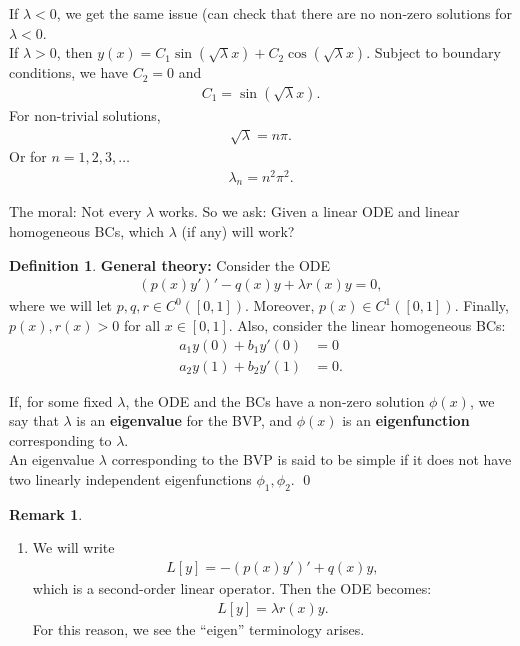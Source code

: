 \documentclass{article}
\theoremstyle{definition}
\newtheorem{defn}{Definition}[section]
\newtheorem{rmk}{Remark}[section]
\begin{document}
If $\lambda < 0$, we get the same issue (can check that there are no non-zero solutions for $\lambda< 0$. \\

If $\lambda > 0$, then $y(x) = C_1 \sin(\sqrt{\lambda} x ) + C_2 \cos(\sqrt{\lambda} x)$. Subject to boundary conditions, we have $C_2 = 0$ and
\begin{align*}
C_1 = \sin(\sqrt{\lambda} x).
\end{align*}
For non-trivial solutions,
\begin{align*}
\sqrt{\lambda}=n\pi.
\end{align*}
Or for $n=1,2,3,\dots$
\begin{align*}
\lambda_n = n^2 \pi^2.
\end{align*}

The moral: Not every $\lambda$ works. So we ask: Given a linear ODE and linear homogeneous BCs, which $\lambda$ (if any) will work?\\

\begin{defn}
	\textbf{General theory:} Consider the ODE
	\begin{align*}
	(p(x)y')' - q(x)y + \lambda r(x)y = 0,
	\end{align*}
	where we will let $p,q,r \in C^0([0,1])$. Moreover, $p(x) \in C^1([0,1])$. Finally, $p(x),r(x) > 0$ for all $x\in[0,1]$. Also, consider the linear homogeneous BCs:
	\begin{align*}
	a_1y(0) + b_1y'(0) &= 0\\
	a_2y(1) + b_2y'(1) &= 0.
	\end{align*}
	
	If, for some fixed $\lambda$, the ODE and the BCs have a non-zero solution $\phi(x)$, we say that $\lambda$ is an \textbf{eigenvalue} for the BVP, and $\phi(x)$ is an \textbf{eigenfunction} corresponding to $\lambda$. \\
	
	An eigenvalue $\lambda$ corresponding to the BVP is said to be simple if it does not have two linearly independent eigenfunctions $\phi_1, \phi_2$. 
	\qed
\end{defn}

\begin{rmk}
	$\,$\\
	\begin{enumerate}
		\item We will write 
		\begin{align*}
		L[y] = -(p(x)y')' + q(x)y,
		\end{align*}
		which is a second-order linear operator. Then the ODE becomes:
		\begin{align*}
		L[y] = \lambda r(x)y.
		\end{align*}
		For this reason, we see the ``eigen'' terminology arises. 
	\end{enumerate}
\end{rmk}
\end{document}
